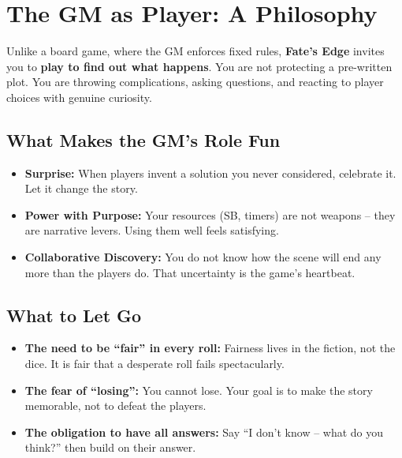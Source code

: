 \section{The GM as Player: A Philosophy}
\label{sec:gm-as-player}

Unlike a board game, where the GM enforces fixed rules, \textbf{Fate's Edge} invites you to \textbf{play to find out what happens}. You are not protecting a pre-written plot. You are throwing complications, asking questions, and reacting to player choices with genuine curiosity.

\subsection{What Makes the GM's Role Fun}
\begin{itemize}
  \item \textbf{Surprise:} When players invent a solution you never considered, celebrate it. Let it change the story.
  \item \textbf{Power with Purpose:} Your resources (SB, timers) are not weapons -- they are narrative levers. Using them well feels satisfying.
  \item \textbf{Collaborative Discovery:} You do not know how the scene will end any more than the players do. That uncertainty is the game's heartbeat.
\end{itemize}

\subsection{What to Let Go}
\begin{itemize}
  \item \textbf{The need to be ``fair'' in every roll:} Fairness lives in the fiction, not the dice. It is fair that a desperate roll fails spectacularly.
  \item \textbf{The fear of ``losing'':} You cannot lose. Your goal is to make the story memorable, not to defeat the players.
  \item \textbf{The obligation to have all answers:} Say ``I don't know -- what do you think?'' then build on their answer.
\end{itemize}

